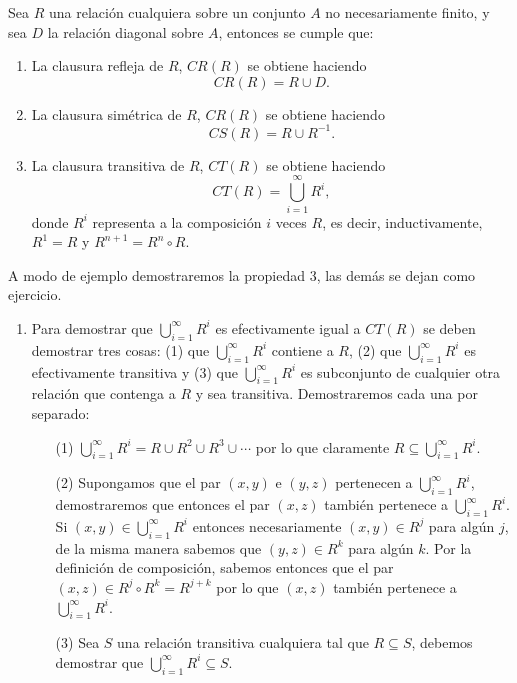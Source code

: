 \begin{teorema}
\label{teo:clausuras-relaciones}
Sea $R$ una relación cualquiera sobre un conjunto $A$ no necesariamente finito, y sea $D$ la relación diagonal sobre $A$, entonces se cumple que:
\begin{enumerate}
  \itemsep 0pt
  \item La clausura refleja de $R$, $CR(R)$ se obtiene haciendo $$CR(R)=R\cup D.$$
  \item La clausura simétrica de $R$, $CR(R)$ se obtiene haciendo $$CS(R)=R\cup R^{-1}.$$
  \item La clausura transitiva de $R$, $CT(R)$ se obtiene haciendo $$CT(R)=\bigcup_{i=1}^{\infty}R^{i},$$
  donde $R^i$ representa a la composición $i$ veces $R$, es decir, inductivamente,
  $R^1=R$ y $R^{n+1}=R^{n}\circ R$.
\end{enumerate}
\begin{demostracion}
A modo de ejemplo demostraremos la propiedad 3, las demás se dejan como ejercicio.
\begin{enumerate}
  \itemsep 0pt
  \item Para demostrar que $\bigcup_{i=1}^{\infty}R^{i}$ es efectivamente igual a $CT(R)$ se deben demostrar tres cosas: (1) que $\bigcup_{i=1}^{\infty}R^{i}$ contiene a $R$, (2) que $\bigcup_{i=1}^{\infty}R^{i}$ es efectivamente transitiva y (3) que $\bigcup_{i=1}^{\infty}R^{i}$ es subconjunto de cualquier otra relación que contenga a $R$ y sea transitiva. %
  Demostraremos cada una por separado:
  \begin{itemize}
  	\itemsep 0pt
    \item[(1)] $\bigcup_{i=1}^{\infty}R^{i}=R\cup R^2\cup R^3\cup\cdots$ por lo que claramente $R\subseteq\bigcup_{i=1}^{\infty}R^{i}$.
    \item[(2)] Supongamos que el par $(x,y)$ e $(y,z)$ pertenecen a $\bigcup_{i=1}^{\infty}R^{i}$, demostraremos que entonces el par $(x,z)$ también pertenece a $\bigcup_{i=1}^{\infty}R^{i}$.
    Si $(x,y)\in\bigcup_{i=1}^{\infty}R^{i}$ entonces necesariamente $(x,y)\in R^j$ para algún $j$, de la misma manera sabemos que $(y,z)\in R^k$ para algún $k$.
    Por la definición de composición, sabemos entonces que el par $(x,z)\in R^j\circ R^k=R^{j+k}$ por lo que $(x,z)$ también pertenece a $\bigcup_{i=1}^{\infty}R^{i}$.
    \item[(3)] Sea $S$ una relación transitiva cualquiera tal que $R\subseteq S$, debemos demostrar que $\bigcup_{i=1}^{\infty}R^{i}\subseteq S$.

\end{itemize}
\end{enumerate}
\end{demostracion}
\end{teorema}
